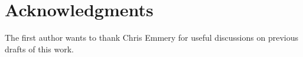 \documentclass{sig-alternate}
\begin{document}
\section{Acknowledgments}
The first author wants to thank Chris Emmery for useful discussions on previous drafts of this work. 



%
%

\end{document}
